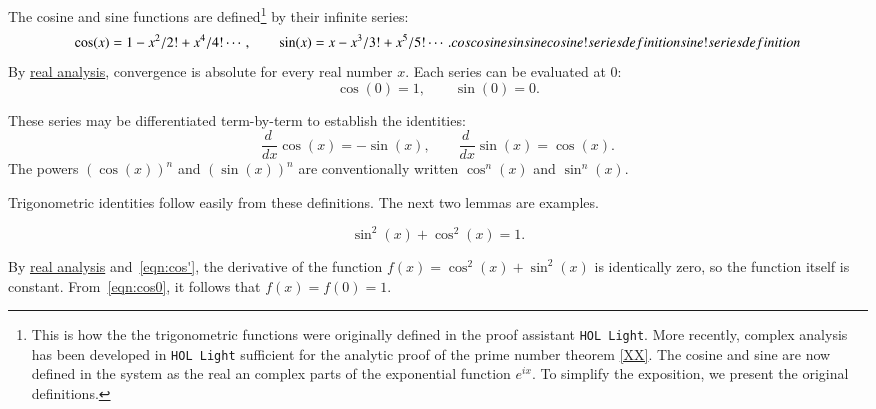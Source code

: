 The cosine and sine functions are defined\footnote{This is how the the trigonometric functions
were originally defined in the proof assistant {\tt HOL Light}.  More recently, complex analysis
has been developed in {\tt HOL Light} sufficient for the analytic proof of the prime number
theorem \ref{XX}.  The cosine and sine are now defined in the system as the real an complex
parts of the exponential function $e^{i x}$.  To simplify the exposition, we present the original
definitions.} by their infinite series:%
\begin{equation}\label{eqn:cos-def}\cos(x) = 1 - x^2/2! + x^4/4! \cdots,\qquad
  \sin(x) = x - x^3/3! + x^5/5! \cdots.
  \indy{Notation}{cos}%
  \indy{Index}{cosine}%
  \indy{Notation}{sin}%
  \indy{Index}{sine}%
  \indy{Index}{cosine!series definition}%
  \indy{Index}{sine!series definition}%
\end{equation}
By \hyperref[back:analysis]{real analysis}, convergence is absolute
for every real number $x$.  Each series can be evaluated at $0$:
\begin{equation}\label{eqn:cos0}
  \cos(0) = 1,\qquad \sin(0) = 0.
\end{equation}


These series may be differentiated term-by-term to establish the
identities: %
\begin{equation}\label{eqn:cos'}
\frac{d\phantom{~}} {dx}\cos(x) 
= -\sin(x),\qquad \frac{ d\phantom{~} }{dx}\sin(x) = \cos(x).
\end{equation}
%
The powers $(\cos(x))^n$ and $(\sin(x))^n$ are conventionally written
$\cos^n(x)$ and $\sin^n(x)$.

Trigonometric identities follow easily from these definitions.  The
next two lemmas are examples.  %

\begin{lemma}[]
\label{lemma:circle} 
\begin{displaymath}
\sin^2(x) + \cos^2(x) = 1.
\end{displaymath}
\end{lemma}
%

\begin{proved}
  By \hyperref[back:analysis]{real analysis} and~\eqref{eqn:cos'}, the
  derivative of the function $f(x) = \cos^2(x) +\sin^2(x)$ is
  identically zero, so the function itself is constant.
  From~\eqref{eqn:cos0}, it follows that $f(x)=f(0)=1$.
  \swallowed\end{proved}


